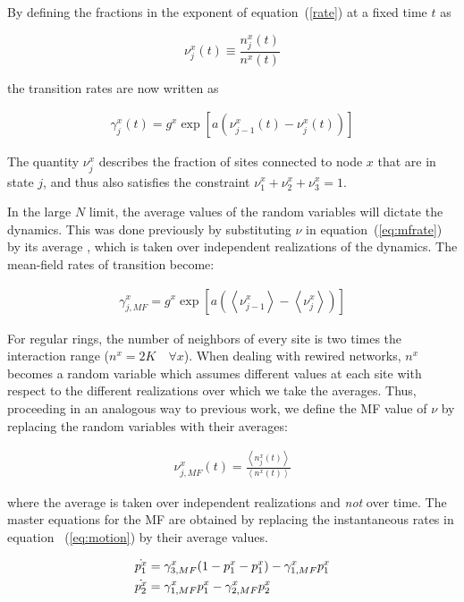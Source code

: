 By defining the fractions in the exponent of equation~(\ref{rate}) at a fixed time $t$ as

\begin{equation}
    \nu^x_j(t) \equiv \frac{n^x_j(t)}{n^x(t)}
\end{equation}

\noindent the transition rates are now written as

\begin{align}
    \gamma^x_j(t) = g^x\exp\left[ a(\nu^x_{j-1}(t) - \nu^x_j(t)) \right]
    \label{eq:mfrate}
\end{align}

The quantity $\nu^x_j$ describes the fraction of sites connected to node $x$ that are in state $j$, and thus also satisfies the
constraint $\nu^x_1+\nu^x_2+\nu^x_3=1$.

In the large $N$ limit, the average values of the random variables will dictate the dynamics. This was done previously by substituting
$\nu$ in equation~(\ref{eq:mfrate}) by its average \cite{escaff2014arrays}, which is taken over independent realizations of the
dynamics.  The mean-field rates of transition become:

\begin{align}
    \gamma^x_{j,MF} = g^x \exp \left[ a \left( \left< \nu^x_{j-1} \right> - \left< \nu^x_j \right> \right) \right]
    \label{gammaMF}
\end{align}

For regular rings, the number of neighbors of every site is two times the interaction range ($n^x = 2K \quad \forall x$). When dealing
with rewired networks, $n^x$ becomes a random variable which assumes different values at each site with respect to the different
realizations over which we take the averages. Thus, proceeding in an analogous way to previous work, we define the MF value of $\nu$ by
replacing the random variables with their averages:

\begin{align}
    \nu^x_{j,MF}(t) = \frac{\left< n^x_j(t) \right>}{\left< n^x(t) \right>}
    \label{eq:numfdef}
\end{align}

\noindent where the average is taken over independent realizations and \textit{not} over time. The master equations for the MF are
obtained by replacing the instantaneous rates in equation~ (\ref{eq:motion}) by their average values.

\begin{align}
    \dot{p^x_1} &= \gamma^x_{3,MF} (1-p^x_1-p^x_1) - \gamma^x_{1,MF} p^x_1 \notag \\
    \dot{p^x_2} &= \gamma^x_{1,MF}  p^x_1 - \gamma^x_{2,MF} p^x_2
    \label{eq:motionmf}
\end{align}

